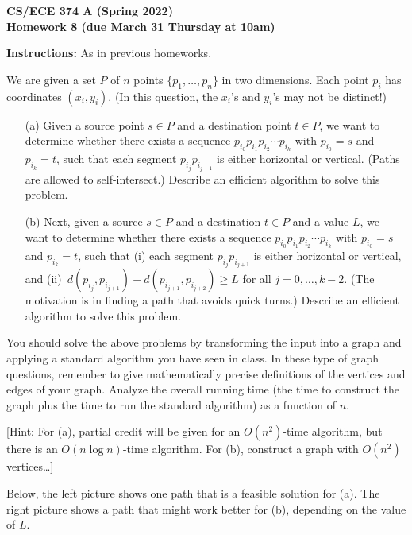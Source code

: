 \documentclass[11pt]{article}
\begin{document}
\begin{center}\Large\bf 
CS/ECE 374 A (Spring 2022)\\
{\Large Homework 8} (due March 31 Thursday at 10am)
\end{center}

\medskip
\noindent
{\bf Instructions:} As in previous homeworks.  


\begin{description}
\bigskip
\item[Problem 8.1:] 
We are given a set $P$ of $n$ points $\{p_1,\ldots,p_n\}$ in two dimensions.  Each point $p_i$
has coordinates $(x_i,y_i)$.  (In this question, the $x_i$'s
and $y_i$'s may not be distinct!)

\begin{enumerate}
\item[(a)]
Given a source point $s\in P$ and a destination point $t\in P$,
we want to determine whether there exists a sequence $p_{i_0}p_{i_1}p_{i_2}\cdots p_{i_k}$ with $p_{i_0}=s$ and $p_{i_k}=t$, such that
each segment $p_{i_j}p_{i_{j+1}}$ is either horizontal or vertical.
(Paths are allowed to self-intersect.)
Describe an efficient algorithm to solve this problem.

\smallskip
\item[(b)]
Next, given a source $s\in P$ and a destination $t\in P$ and a value $L$,
we want to determine whether there exists a sequence $p_{i_0}p_{i_1}p_{i_2}\cdots p_{i_k}$ with $p_{i_0}=s$ and $p_{i_k}=t$, such that
(i) each segment $p_{i_j}p_{i_{j+1}}$ is either horizontal or vertical, and 
(ii)~$d(p_{i_j},p_{i_{j+1}})+d(p_{i_{j+1}},p_{i_{j+2}})\ge L$ for all $j=0,\ldots,k-2$.
(The motivation is in finding a path that avoids quick turns.)  Describe an efficient algorithm to solve this problem.
\end{enumerate}

You should solve the above problems by transforming the input into a graph
and applying a standard algorithm you have seen in class.
In these type of graph questions,
remember to give mathematically precise definitions of the vertices and edges of your graph.  Analyze the overall running time (the time to construct the graph plus the time to run the standard algorithm) as a function of $n$.

[Hint: For (a), partial credit will be given for an $O(n^2)$-time algorithm, but there is an $O(n\log n)$-time algorithm.  For (b), construct a graph with $O(n^2)$ vertices\ldots]

Below, the left picture shows one path that is a feasible solution for (a).  The right
picture shows a path that might work better for (b), depending on the value of $L$.


\end{description}
\end{document}
